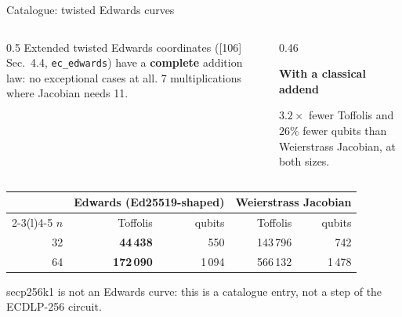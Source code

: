 \documentclass[aspectratio=169,11pt]{beamer}
\newcommand{\peachtitle}[1]{{\bfseries\color{cverm}#1}\par\vskip1mm}
\begin{document}
\begin{frame}{Catalogue: twisted Edwards curves}
  \begin{columns}[c]
    \begin{column}{0.5\textwidth}
      \small Extended twisted Edwards coordinates ([106] Sec.~4.4, \texttt{ec\_edwards}) have a \textbf{complete} addition law: no exceptional cases at all.
      \vskip2mm
      7 multiplications where Jacobian needs 11.
    \end{column}
    \begin{column}{0.46\textwidth}
      \begin{peachblock}[fontupper=\small]\peachtitle{With a classical addend}
        $3.2\times$ fewer Toffolis and $26\%$ fewer qubits than Weierstrass Jacobian, at both sizes.
      \end{peachblock}
    \end{column}
  \end{columns}
  \vskip4mm
  \centering\footnotesize
  \renewcommand{\arraystretch}{1.15}
  \begin{tabular}{@{}rrrrr@{}}
    \toprule
    & \multicolumn{2}{c}{Edwards (Ed25519-shaped)} & \multicolumn{2}{c}{Weierstrass Jacobian} \\
    \cmidrule(lr){2-3}\cmidrule(l){4-5}
    $n$ & Toffolis & qubits & Toffolis & qubits \\
    \midrule
    32 & \textbf{44\,438} & 550 & 143\,796 & 742 \\
    64 & \textbf{172\,090} & 1\,094 & 566\,132 & 1\,478 \\
    \bottomrule
  \end{tabular}\par
  \vskip2mm
  {\scriptsize secp256k1 is not an Edwards curve: this is a catalogue entry, not a step of the ECDLP-256 circuit.}
\end{frame}
\end{document}
